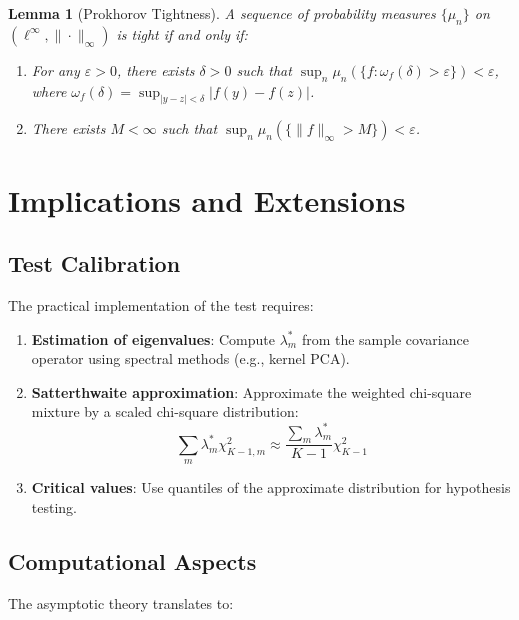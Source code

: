 \documentclass[12pt]{article}
\theoremstyle{plain}
\newtheorem{lemma}[theorem]{Lemma}
\theoremstyle{definition}
\newcommand{\eps}{\varepsilon}
\newcommand{\1}[1]{\mathbf{1}_{#1}}
\begin{document}
\begin{lemma}[Prokhorov Tightness]
A sequence of probability measures $\{\mu_n\}$ on $(\ell^\infty, \|\cdot\|_\infty)$ is tight if and only if:

\begin{enumerate}
\item For any $\eps > 0$, there exists $\delta > 0$ such that $\sup_n \mu_n(\{f: \omega_f(\delta) > \eps\}) < \eps$, where $\omega_f(\delta) = \sup_{|y-z| < \delta} |f(y) - f(z)|$.

\item There exists $M < \infty$ such that $\sup_n \mu_n(\{\|f\|_\infty > M\}) < \eps$.
\end{enumerate}
\end{lemma}

\section{Implications and Extensions}

\subsection{Test Calibration}

The practical implementation of the test requires:

\begin{enumerate}
\item \textbf{Estimation of eigenvalues}: Compute $\lambda_m^*$ from the sample covariance operator using spectral methods (e.g., kernel PCA).

\item \textbf{Satterthwaite approximation}: Approximate the weighted chi-square mixture by a scaled chi-square distribution:
\begin{equation}
\sum_m \lambda_m^* \chi^2_{K-1,m} \approx \frac{\sum_m \lambda_m^*}{K-1} \chi^2_{K-1}
\end{equation}

\item \textbf{Critical values}: Use quantiles of the approximate distribution for hypothesis testing.
\end{enumerate}

\subsection{Computational Aspects}

The asymptotic theory translates to:
\end{document}
